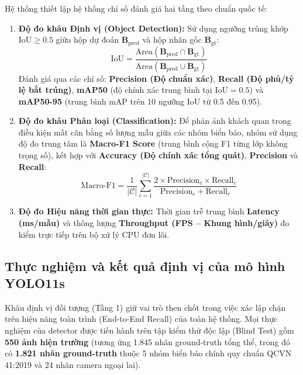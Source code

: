 \documentclass[a4paper, 11pt]{article}
\begin{document}
Hệ thống thiết lập hệ thống chỉ số đánh giá hai tầng theo chuẩn quốc tế:

\begin{enumerate}
    \item \textbf{Độ đo khâu Định vị (Object Detection):} Sử dụng ngưỡng trùng khớp $\text{IoU} \ge 0.5$ giữa hộp dự đoán $\mathbf{B}_{\text{pred}}$ và hộp nhãn gốc $\mathbf{B}_{\text{gt}}$:
    \begin{equation}
        \text{IoU} = \frac{\text{Area}(\mathbf{B}_{\text{pred}} \cap \mathbf{B}_{\text{gt}})}{\text{Area}(\mathbf{B}_{\text{pred}} \cup \mathbf{B}_{\text{gt}})}
        \label{eq:iou}
    \end{equation}
    Đánh giá qua các chỉ số: \textbf{Precision (Độ chuẩn xác)}, \textbf{Recall (Độ phủ/tỷ lệ bắt trúng)}, \textbf{mAP50} (độ chính xác trung bình tại $\text{IoU} = 0.5$) và \textbf{mAP50-95} (trung bình mAP trên 10 ngưỡng IoU từ 0.5 đến 0.95).

    \item \textbf{Độ đo khâu Phân loại (Classification):} Để phản ánh khách quan trong điều kiện mất cân bằng số lượng mẫu giữa các nhóm biển báo, nhóm sử dụng độ đo trung tâm là \textbf{Macro-F1 Score} (trung bình cộng F1 từng lớp không trọng số), kết hợp với \textbf{Accuracy (Độ chính xác tổng quát)}, \textbf{Precision} và \textbf{Recall}:
    \begin{equation}
        \text{Macro-F1} = \frac{1}{|\mathcal{C}|} \sum_{c=1}^{|\mathcal{C}|} \frac{2 \times \text{Precision}_c \times \text{Recall}_c}{\text{Precision}_c + \text{Recall}_c}
        \label{eq:macro_f1}
    \end{equation}

    \item \textbf{Độ đo Hiệu năng thời gian thực:} Thời gian trễ trung bình \textbf{Latency (ms/mẫu)} và thông lượng \textbf{Throughput (FPS -- Khung hình/giây)} đo kiểm trực tiếp trên bộ xử lý CPU đơn lõi.
\end{enumerate}

\subsection{Thực nghiệm và kết quả định vị của mô hình YOLO11s}
\label{subsec:kq_yolo}

Khâu định vị đối tượng (Tầng 1) giữ vai trò then chốt trong việc xác lập chặn trên hiệu năng toàn trình (End-to-End Recall) của toàn hệ thống. Mọi thực nghiệm của detector được tiến hành trên tập kiểm thử độc lập (Blind Test) gồm \textbf{550 ảnh hiện trường} (tương ứng 1.845 nhãn ground-truth tổng thể, trong đó có \textbf{1.821 nhãn ground-truth} thuộc 5 nhóm biển báo chính quy chuẩn QCVN 41:2019 và 24 nhãn camera ngoại lai).
\end{document}
